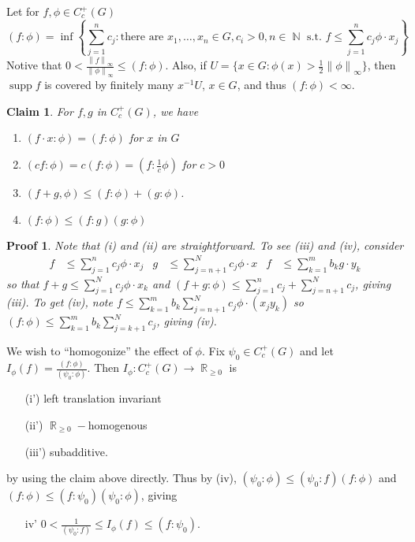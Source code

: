 \documentclass[11pt, a4paper]{memoir}
\DeclareMathOperator{\N}{{\mathbb{N}}}
\DeclareMathOperator{\R}{{\mathbb{R}}}
\newcommand{\norm}[1]{\ensuremath{\left\lVert#1\right\rVert}}
\theoremstyle{change}
\theoremstyle{plain}
\newtheorem{claim}{Claim}
\theoremstyle{nonumberplain}
\newtheorem{nmproof}{Proof}
\DeclareMathOperator{\supp}{supp}
\numberwithin{equation}{section}
\begin{document}
Let for $f,\phi\in C_c^+(G)$
\begin{equation*}
    (f:\phi)=\inf\left\{\sum_{j=1}^n c_j:\text{there are }x_1,\ldots,x_n\in G,c_i>0,n\in\N \text{ s.t. }f\leq\sum_{j=1}^n c_j\phi\cdot x_j\right\}
\end{equation*}
Notive that $0<\frac{\norm{f}_\infty}{\norm{\phi}_\infty}\leq(f:\phi)$.
Also, if $U=\{x\in G:\phi(x)>\frac{1}{2}\norm{\phi}_\infty\}$, then $\supp f$ is covered by finitely many $x^{-1}U$, $x\in G$, and thus $(f:\phi)<\infty$.
\begin{claim}
    For $f,g$ in $C_c^+(G)$, we have
    \begin{enumerate}[nl,r]
        \item $(f\cdot x:\phi)=(f:\phi)$ for $x$ in $G$
        \item $(cf:\phi)=c(f:\phi)=(f:\frac{1}{c}\phi)$ for $c>0$
        \item $(f+g,\phi)\leq (f:\phi)+(g:\phi)$.
        \item $(f:\phi)\leq (f:g)(g:\phi)$
    \end{enumerate}
\end{claim}
\begin{nmproof}
    Note that (i) and (ii) are straightforward.
    To see (iii) and (iv), consider
    \begin{align*}
        f&\leq\sum_{j=1}^n c_j\phi\cdot x_j & g&\leq\sum_{j=n+1}^Nc_j\phi\cdot x & f&\leq\sum_{k=1}^m b_kg\cdot y_k
    \end{align*}
    so that $f+g\leq\sum_{j=1}^Nc_j\phi\cdot x_k$ and $(f+g:\phi)\leq\sum_{j=1}^n c_j+\sum_{j=n+1}^N c_j$, giving (iii).
    To get (iv), note $f\leq\sum_{k=1}^m b_k\sum_{j=n+1}^N c_j\phi\cdot(x_jy_k)$ so $(f:\phi)\leq\sum_{k=1}^m b_k\sum_{j=k+1}^Nc_j$, giving (iv).
\end{nmproof}
We wish to ``homogonize'' the effect of $\phi$.
Fix $\psi_0\in C_c^+(G)$ and let $I_\phi(f)=\frac{(f:\phi)}{(\psi_0:\phi)}$.
Then $I_\phi:C_c^+(G)\to\R_{\geq 0}$ is
\begin{enumerate}[nl]
    \item[(i')] left translation invariant
    \item[(ii')] $\R_{\geq 0}-$homogenous
    \item[(iii')] subadditive.
\end{enumerate}
by using the claim above directly.
Thus by (iv), $(\psi_0:\phi)\leq(\psi_0:f)(f:\phi)$ and $(f:\phi)\leq(f:\psi_0)(\psi_0:\phi)$, giving
\begin{enumerate}[nl]
    \item[iv'] $0<\frac{1}{(\psi_0:f)}\leq I_\phi(f)\leq (f:\psi_0)$.
\end{enumerate}
\end{document}

